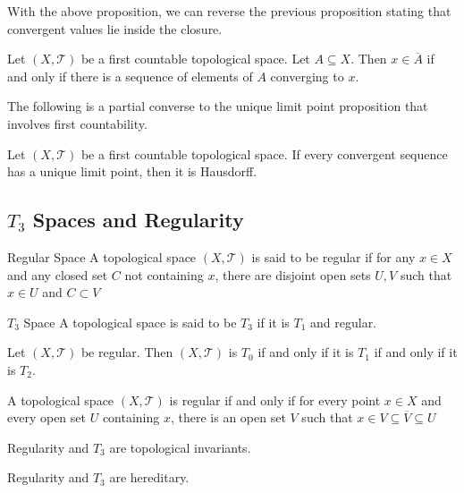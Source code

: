 With the above proposition, we can reverse the previous proposition stating that convergent values lie inside the closure. 

\begin{prp}{}{} Let $(X,\mathcal{T})$ be a first countable topological space. Let $A\subseteq X$. Then $x\in\overline{A}$ if and only if there is a sequence of elements of $A$ converging to $x$. 
\end{prp}

The following is a partial converse to the unique limit point proposition that involves first countability. 


\begin{prp}{}{} Let $(X,\mathcal{T})$ be a first countable topological space. If every convergent sequence has a unique limit point, then it is Hausdorff. 
\end{prp}

\subsection{$T_3$ Spaces and Regularity}
\begin{defn}{Regular Space}{} A topological space $(X,\mathcal{T})$ is said to be regular if for any $x\in X$ and any closed set $C$ not containing $x$, there are disjoint open sets $U,V$ such that $x\in U$ and $C\subset V$
\end{defn}

\begin{defn}{$T_3$ Space}{} A topological space is said to be $T_3$ if it is $T_1$ and regular. 
\end{defn}

\begin{prp}{}{} Let $(X,\mathcal{T})$ be regular. Then $(X,\mathcal{T})$ is $T_0$ if and only if it is $T_1$ if and only if it is $T_2$. 
\end{prp}

\begin{prp}{}{} A topological space $(X,\mathcal{T})$ is regular if and only if for every point $x\in X$ and every open set $U$ containing $x$, there is an open set $V$ such that $x\in V\subseteq\overline{V}\subseteq U$
\end{prp}

\begin{prp}{}{} Regularity and $T_3$ are topological invariants. 
\end{prp}

\begin{prp}{}{} Regularity and $T_3$ are hereditary. 
\end{prp}

